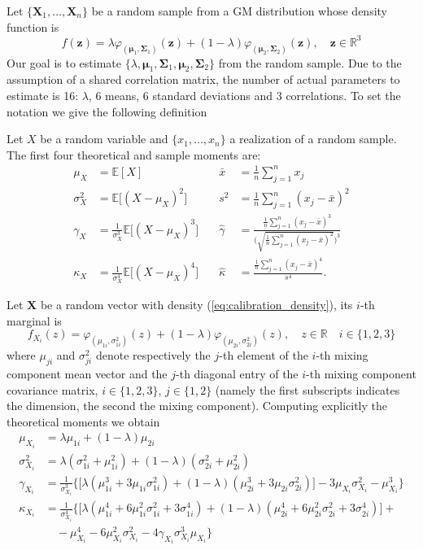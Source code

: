 Let $\{\bm{X}_1,\ldots,\bm{X}_n \}$ be a random sample from a GM distribution whose density function is 
\begin{equation}\label{eq:calibration_density}
f(\bm{z}) = \lambda \varphi_{(\bm{\mu}_1,\bm{\Sigma}_1)}(\bm{z}) + (1-\lambda)\varphi_{(\bm{\mu}_2,\bm{\Sigma}_2)}(\bm{z}),\quad \bm{z} \in \mathbb{R}^3
\end{equation}
Our goal is to estimate $\{\lambda,\bm{\mu}_1,\bm{\Sigma}_1,\bm{\mu}_2,\bm{\Sigma}_2 \}$ from the random sample. Due to the assumption of a shared correlation matrix, the number of actual parameters to estimate is 16: $\lambda$, 6 means, 6 standard deviations and 3 correlations.
To set the notation we give the following definition
\begin{definition}
	Let $X$ be a random variable and $\{x_1,\ldots,x_n\} $ a realization of a random sample. The first four theoretical and sample moments are:
	\begin{align*}
	\mu_X & = \mathbb{E}[X] \quad & \bar{x} &= \frac{1}{n}\sum_{j=1}^{n}x_j\\[2ex]
	\sigma^2_X & = \mathbb{E}\big[(X-\mu_X)^2\big] \quad & s^2 &= \frac{1}{n}\sum_{j=1}^{n}(x_j-\bar{x})^2\\[2ex]
	\gamma_X & = \frac{1}{\sigma_X^3}\mathbb{E}\big[(X-\mu_X)^3\big] \quad & \widehat{\gamma} & = \frac{\frac{1}{n}\sum_{j=1}^{n}(x_j-\bar{x})^3}{\Big(\sqrt{\frac{1}{n}\sum_{j=1}^{n}(x_j-\bar{x})^2} \Big)^3}\\[2ex]
	\kappa_X & = \frac{1}{\sigma_X^4}\mathbb{E}\big[ (X-\mu_X)^4\big] \quad & \widehat{\kappa}&= \frac{\frac{1}{n}\sum_{j=1}^{n}(x_j-\bar{x})^4}{s^4}.
	\end{align*}
\end{definition}
Let $\bm{X}$ be a random vector with density (\ref{eq:calibration_density}), its $i$-th marginal is \[f_{X_i}(z) = \varphi_{(\mu_{1i},\sigma^2_{1i})}(z)+(1-\lambda)\varphi_{(\mu_{2i},\sigma^2_{2i})}(z), \quad z \in \mathbb{R} \quad  i \in \{1,2,3\} \]
where $\mu_{ji}$ and $\sigma^2_{ji}$ denote respectively the $j$-th element of the $i$-th mixing component mean vector  and the $j$-th diagonal entry of the $i$-th mixing component covariance matrix, $i \in \{1,2,3\}$, $j \in \{1,2\}$ (namely the first subscripts indicates the dimension, the second the mixing component). Computing explicitly the theoretical moments we obtain
\begin{align*}
\mu_{X_i} & = \lambda\mu_{1i}+(1-\lambda)\mu_{2i}\\[15pt] 
\sigma^2_{X_i} & = \lambda(\sigma^2_{1i}+\mu^2_{1i})+(1-\lambda)(\sigma^2_{2i}+\mu^2_{2i})\\[15pt]
\gamma_{X_i} & = \frac{1}{\sigma^3_{X_i}}\Big\{\big[\lambda(\mu^3_{1i}+3\mu_{1i}\sigma^2_{1i}) + (1-\lambda)(\mu^3_{2i}+3\mu_{2i}\sigma^2_{2i})\big] -3\mu_{X_i}\sigma^2_{X_i}-\mu^3_{X_i} \Big\}\\[15pt]
\kappa_{X_i}&= \frac{1}{\sigma^4_{X_i}}\Big\{\big[\lambda(\mu^4_{1i}+6\mu^2_{1i}\sigma^2_{1i}+3\sigma^4_{1i})+(1-\lambda)(\mu^4_{2i}+6\mu^2_{2i}\sigma^2_{2i}+3\sigma^4_{2i}) \big] +\\
& \quad -\mu^4_{X_i} -6\mu^2_{X_i}\sigma^2_{X_i}-4\gamma_{X_i}\sigma^3_{X_i}\mu_{X_i} \Big\}
\end{align*}
